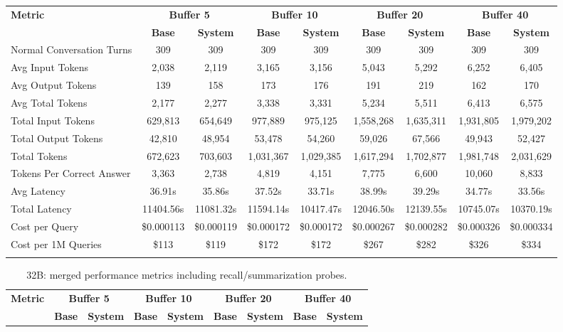 \begin{landscape}
\begin{longtable}{@{}p{3.8cm}cccccccc@{}}
\toprule
\textbf{Metric} & \multicolumn{2}{c}{\textbf{Buffer 5}} & \multicolumn{2}{c}{\textbf{Buffer 10}} & \multicolumn{2}{c}{\textbf{Buffer 20}} & \multicolumn{2}{c}{\textbf{Buffer 40}} \\
\cmidrule(lr){2-3}\cmidrule(lr){4-5}\cmidrule(lr){6-7}\cmidrule(lr){8-9}
 & \textbf{Base} & \textbf{System} & \textbf{Base} & \textbf{System} & \textbf{Base} & \textbf{System} & \textbf{Base} & \textbf{System} \\
\midrule
\endhead
Normal Conversation Turns & 309 & 309 & 309 & 309 & 309 & 309 & 309 & 309 \\
Avg Input Tokens & 2,038 & 2,119 & 3,165 & 3,156 & 5,043 & 5,292 & 6,252 & 6,405 \\
Avg Output Tokens & 139 & 158 & 173 & 176 & 191 & 219 & 162 & 170 \\
Avg Total Tokens & 2,177 & 2,277 & 3,338 & 3,331 & 5,234 & 5,511 & 6,413 & 6,575 \\
Total Input Tokens & 629,813 & 654,649 & 977,889 & 975,125 & 1,558,268 & 1,635,311 & 1,931,805 & 1,979,202 \\
Total Output Tokens & 42,810 & 48,954 & 53,478 & 54,260 & 59,026 & 67,566 & 49,943 & 52,427 \\
Total Tokens & 672,623 & 703,603 & 1,031,367 & 1,029,385 & 1,617,294 & 1,702,877 & 1,981,748 & 2,031,629 \\
Tokens Per Correct Answer & 3,363 & 2,738 & 4,819 & 4,151 & 7,775 & 6,600 & 10,060 & 8,833 \\
Avg Latency & 36.91s & 35.86s & 37.52s & 33.71s & 38.99s & 39.29s & 34.77s & 33.56s \\
Total Latency & 11404.56s & 11081.32s & 11594.14s & 10417.47s & 12046.50s & 12139.55s & 10745.07s & 10370.19s \\
Cost per Query & \$0.000113 & \$0.000119 & \$0.000172 & \$0.000172 & \$0.000267 & \$0.000282 & \$0.000326 & \$0.000334 \\
Cost per 1M Queries & \$113 & \$119 & \$172 & \$172 & \$267 & \$282 & \$326 & \$334 \\
\botrule
\end{longtable}
\begin{longtable}{@{}p{3.8cm}cccccccc@{}}
\caption{32B: merged performance metrics including recall/summarization probes.}\label{tab:app_32b_perf_probe}\\

\toprule
\textbf{Metric} & \multicolumn{2}{c}{\textbf{Buffer 5}} & \multicolumn{2}{c}{\textbf{Buffer 10}} & \multicolumn{2}{c}{\textbf{Buffer 20}} & \multicolumn{2}{c}{\textbf{Buffer 40}} \\
\cmidrule(lr){2-3}\cmidrule(lr){4-5}\cmidrule(lr){6-7}\cmidrule(lr){8-9}
 & \textbf{Base} & \textbf{System} & \textbf{Base} & \textbf{System} & \textbf{Base} & \textbf{System} & \textbf{Base} & \textbf{System} \\
\midrule
\endfirsthead


\end{longtable}
\end{landscape}
